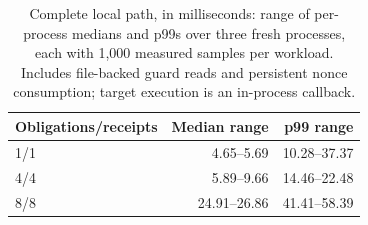 \begin{table}[t]
\centering\small
\caption{Complete local path, in milliseconds: range of per-process medians and p99s over three fresh processes, each with 1,000 measured samples per workload. Includes file-backed guard reads and persistent nonce consumption; target execution is an in-process callback.}
\label{tab:repaired-overhead}
\begin{tabular}{@{}lrr@{}}
\toprule
Obligations/receipts & Median range & p99 range \\
\midrule
1/1 & 4.65--5.69 & 10.28--37.37 \\
4/4 & 5.89--9.66 & 14.46--22.48 \\
8/8 & 24.91--26.86 & 41.41--58.39 \\
\bottomrule
\end{tabular}
\end{table}
